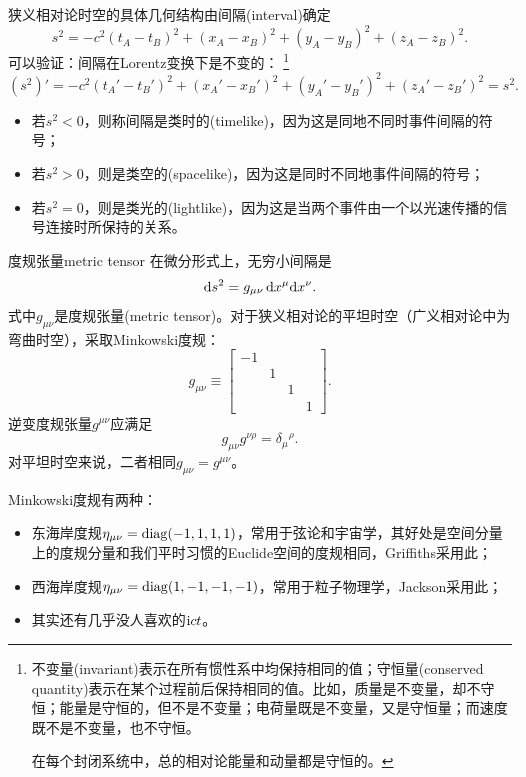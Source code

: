 狭义相对论时空的具体几何结构由间隔(interval)确定
\[
    s^2=-c^2(t_A-t_B)^2+(x_A-x_B)^2+(y_A-y_B)^2+(z_A-z_B)^2.
\]
可以验证：间隔在Lorentz变换下是不变的：
\footnote{
不变量(invariant)表示在所有惯性系中均保持相同的值；守恒量(conserved quantity)表示在某个过程前后保持相同的值。比如，质量是不变量，却不守恒；能量是守恒的，但不是不变量；电荷量既是不变量，又是守恒量；而速度既不是不变量，也不守恒。

在每个封闭系统中，总的相对论能量和动量都是守恒的。
}
\[
    (s^2)'=-c^2(t_A'-t_B')^2+(x_A'-x_B')^2+(y_A'-y_B')^2+(z_A'-z_B')^2=s^2.
\]
\begin{itemize}
    \item 若$s^2<0$，则称间隔是类时的(timelike)，因为这是同地不同时事件间隔的符号；
    \item 若$s^2>0$，则是类空的(spacelike)，因为这是同时不同地事件间隔的符号；
    \item 若$s^2=0$，则是类光的(lightlike)，因为这是当两个事件由一个以光速传播的信号连接时所保持的关系。
\end{itemize}
\begin{definition}
    {度规张量}{metric tensor}
    在微分形式上，无穷小间隔是
    \begin{equation}
        \mathop{}\!\mathrm{d} s^2=g_{\mu\nu}\mathop{}\!\mathrm{d} x^\mu\mathrm{d} x^\nu.
    \end{equation}
    式中$g_{\mu\nu}$是度规张量(metric tensor)。对于狭义相对论的平坦时空（广义相对论中为弯曲时空），采取Minkowski度规：
    \begin{equation}
        g_{\mu\nu}\equiv
        \begin{bmatrix}
            -1\\ &1\\ &&1\\ &&&1
        \end{bmatrix}.
    \end{equation}
    逆变度规张量$g^{\mu\nu}$应满足
    \begin{equation}
        g_{\mu\nu}g^{\nu\rho}=\delta_\mu{}^\rho.
    \end{equation}
    对平坦时空来说，二者相同$g_{\mu\nu}=g^{\mu\nu}$。
\end{definition}
\begin{remark}
    Minkowski度规有两种：
    \begin{itemize}
        \item 东海岸度规$\eta_{\mu\nu}=\operatorname{diag}(-1,1,1,1)$，常用于弦论和宇宙学，其好处是空间分量上的度规分量和我们平时习惯的Euclide空间的度规相同，Griffiths采用此；
        \item 西海岸度规$\eta_{\mu\nu}=\operatorname{diag}(1,-1,-1,-1)$，常用于粒子物理学，Jackson采用此；
        \item 其实还有几乎没人喜欢的$\mathrm{i} ct$。
    \end{itemize}
\end{remark}

